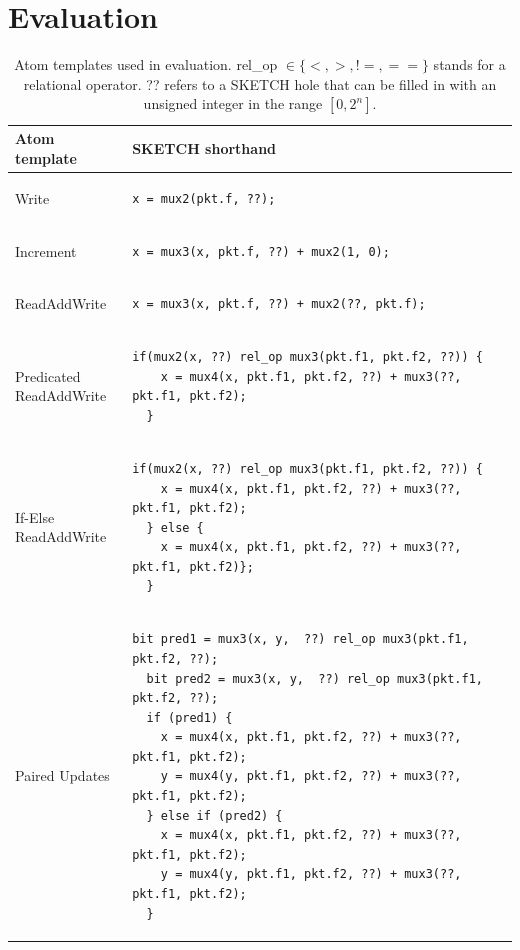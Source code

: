\section{Evaluation}
\label{s:eval}

\begin{table}[!t]
  \begin{scriptsize}
  \begin{tabular}{|p{}|p{}|}
  \hline
  Atom template & SKETCH shorthand\\
  \hline
  Write &
  {\begin{lstlisting}[style=customctable]
  x = mux2(pkt.f, ??);
  \end{lstlisting}} \\
  \hline
  Increment &
  {\begin{lstlisting}[style=customctable]
  x = mux3(x, pkt.f, ??) + mux2(1, 0);
  \end{lstlisting}} \\
  \hline
  ReadAddWrite &
  {\begin{lstlisting}[style=customctable]
  x = mux3(x, pkt.f, ??) + mux2(??, pkt.f);
  \end{lstlisting}} \\
  \hline
  \pbox{0.15\textwidth}
  {Predicated\\
  ReadAddWrite} &
  {\begin{lstlisting}[style=customctable]
  if(mux2(x, ??) rel_op mux3(pkt.f1, pkt.f2, ??)) {
    x = mux4(x, pkt.f1, pkt.f2, ??) + mux3(??, pkt.f1, pkt.f2);
  }
  \end{lstlisting}} \\
  \hline
  \pbox{0.15\textwidth}
  {If-Else\\
   ReadAddWrite} &
  {\begin{lstlisting}[style=customctable]
  if(mux2(x, ??) rel_op mux3(pkt.f1, pkt.f2, ??)) {
    x = mux4(x, pkt.f1, pkt.f2, ??) + mux3(??, pkt.f1, pkt.f2);
  } else {
    x = mux4(x, pkt.f1, pkt.f2, ??) + mux3(??, pkt.f1, pkt.f2)};
  }
  \end{lstlisting}} \\
  \hline
  Paired Updates &
  {\begin{lstlisting}[style=customctable]
  bit pred1 = mux3(x, y,  ??) rel_op mux3(pkt.f1, pkt.f2, ??);
  bit pred2 = mux3(x, y,  ??) rel_op mux3(pkt.f1, pkt.f2, ??);
  if (pred1) {
    x = mux4(x, pkt.f1, pkt.f2, ??) + mux3(??, pkt.f1, pkt.f2);
    y = mux4(y, pkt.f1, pkt.f2, ??) + mux3(??, pkt.f1, pkt.f2);
  } else if (pred2) {
    x = mux4(x, pkt.f1, pkt.f2, ??) + mux3(??, pkt.f1, pkt.f2);
    y = mux4(y, pkt.f1, pkt.f2, ??) + mux3(??, pkt.f1, pkt.f2);
  }
  \end{lstlisting}} \\
  \hline
  \end{tabular}
\end{scriptsize}
  \caption{Atom templates used in evaluation. rel\_op $\in \{<, >, != , ==\}$ stands for a relational operator. ?? refers to a SKETCH hole that can be filled in with an unsigned integer in the range $[0, 2^n]$.}
  \label{tab:templates}
\end{table}


